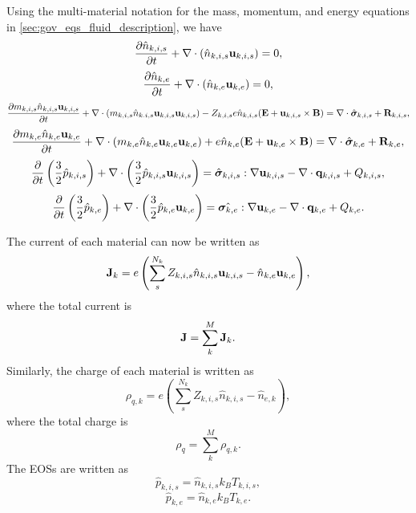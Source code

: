 \documentclass[a4paper,11pt]{report}
\begin{document}
Using the multi-material notation for the mass, momentum, and energy equations in \cref{sec:gov_eqs_fluid_description}, we have
\begin{equation}
    \frac{\partial \hat{n}_{k,i,s}}{\partial t} + \nabla \cdot \left ( \hat{n}_{k,i,s} \mathbf{u}_{k,i,s} \right ) = 0,
\end{equation}
\begin{equation}
    \frac{\partial \hat{n}_{k,e}}{\partial t} + \nabla \cdot \left ( \hat{n}_{k,e} \mathbf{u}_{k,e} \right ) = 0,
\end{equation}
\begin{equation}
    \frac{\partial m_{k,i,s} \hat{n}_{k,i,s} \mathbf{u}_{k,i,s}}{\partial t} + \nabla \cdot \left( m_{k,i,s} \hat{n}_{k.i,s} \mathbf{u}_{k,i,s} \mathbf{u}_{k,i,s} \right) 
    - Z_{k,i,s} e \hat{n}_{k,i,s} ( \mathbf{E} + \mathbf{u}_{k,i,s} \times \mathbf{B} ) = \nabla \cdot \hat{\bm \sigma}_{k,i,s} + \mathbf{R}_{k,i,s},
\end{equation}
\begin{equation}
    \frac{\partial m_{k,e} \hat{n}_{k,e} \mathbf{u}_{k,e}}{\partial t} + \nabla \cdot \left( m_{k,e} \hat{n}_{k,e} \mathbf{u}_{k,e} \mathbf{u}_{k,e} \right) + e \hat{n}_{k,e} ( \mathbf{E} + \mathbf{u}_{k,e} \times \mathbf{B} ) = \nabla \cdot \hat{\bm \sigma}_{k,e} + \mathbf{R}_{k,e},
\end{equation}
\begin{equation}
    \frac{\partial}{\partial t} \left ( \frac{3}{2} \hat{p}_{k,i,s} \right ) + \nabla \cdot \left ( \frac{3}{2} \hat{p}_{k,i,s} \mathbf{u}_{k,i,s} \right ) = \hat{\bm \sigma}_{k,i,s} : \nabla \mathbf{u}_{k,i,s} - \nabla \cdot \mathbf{q}_{k,i,s} + Q_{k,i,s},
\end{equation}
\begin{equation}
    \frac{\partial}{\partial t} \left ( \frac{3}{2} \hat{p}_{k,e} \right ) + \nabla \cdot \left ( \frac{3}{2} \hat{p}_{k,e} \mathbf{u}_{k,e} \right ) = \hat{\bm \sigma_{k,e}} : \nabla \mathbf{u}_{k,e} - \nabla \cdot \mathbf{q}_{k,e} + Q_{k,e}.
\end{equation}

The current of each material can now be written as
\begin{equation}
    \mathbf{J}_k = e \left( \sum_s^{N_k} Z_{k,i,s} \hat{n}_{k,i,s} \mathbf{u}_{k,i,s} - \hat{n}_{k,e} \mathbf{u}_{k,e} \right),
\end{equation}
where the total current is
\begin{equation}
    \mathbf{J} = \sum_k^M \mathbf{J}_k.
\end{equation}
Similarly, the charge of each material is written as
\begin{equation}
    \rho_{q,k} = e \left( \sum_s^{N_k} Z_{k,i,s} \hat{n}_{k,i,s} - \hat{n}_{e,k} \right),
\end{equation}
where the total charge is
\begin{equation}
    \rho_q = \sum_k^M \rho_{q,k}.
\end{equation}
The EOSs are written as
\begin{equation}
    \hat{p}_{k,i,s} = \hat{n}_{k,i,s} k_B T_{k,i,s},
\end{equation}
\begin{equation}
    \hat{p}_{k,e} = \hat{n}_{k,e} k_B T_{k,e}.
\end{equation}
\end{document}
